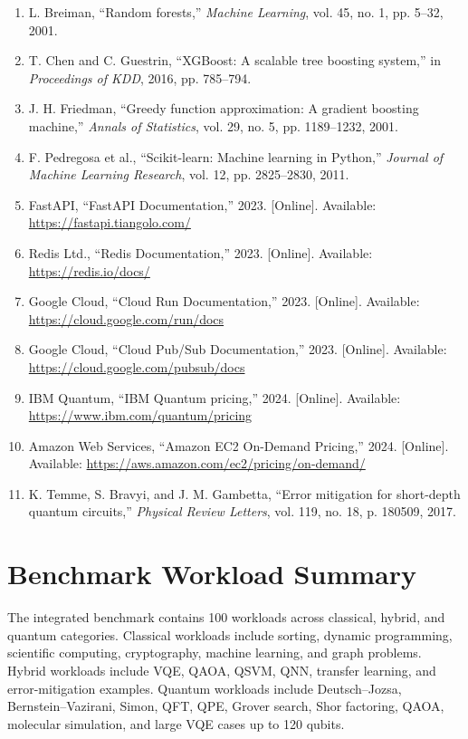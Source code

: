 \documentclass[12pt,a4paper]{report}
\begin{document}
\begin{enumerate}
\item L. Breiman, ``Random forests,'' \textit{Machine Learning}, vol. 45, no. 1, pp. 5--32, 2001.
\item T. Chen and C. Guestrin, ``XGBoost: A scalable tree boosting system,'' in \textit{Proceedings of KDD}, 2016, pp. 785--794.
\item J. H. Friedman, ``Greedy function approximation: A gradient boosting machine,'' \textit{Annals of Statistics}, vol. 29, no. 5, pp. 1189--1232, 2001.
\item F. Pedregosa et al., ``Scikit-learn: Machine learning in Python,'' \textit{Journal of Machine Learning Research}, vol. 12, pp. 2825--2830, 2011.
\item FastAPI, ``FastAPI Documentation,'' 2023. [Online]. Available: \url{https://fastapi.tiangolo.com/}
\item Redis Ltd., ``Redis Documentation,'' 2023. [Online]. Available: \url{https://redis.io/docs/}
\item Google Cloud, ``Cloud Run Documentation,'' 2023. [Online]. Available: \url{https://cloud.google.com/run/docs}
\item Google Cloud, ``Cloud Pub/Sub Documentation,'' 2023. [Online]. Available: \url{https://cloud.google.com/pubsub/docs}
\item IBM Quantum, ``IBM Quantum pricing,'' 2024. [Online]. Available: \url{https://www.ibm.com/quantum/pricing}
\item Amazon Web Services, ``Amazon EC2 On-Demand Pricing,'' 2024. [Online]. Available: \url{https://aws.amazon.com/ec2/pricing/on-demand/}
\item K. Temme, S. Bravyi, and J. M. Gambetta, ``Error mitigation for short-depth quantum circuits,'' \textit{Physical Review Letters}, vol. 119, no. 18, p. 180509, 2017.
\end{enumerate}

\appendix
\chapter{Benchmark Workload Summary}
The integrated benchmark contains 100 workloads across classical, hybrid, and quantum categories. Classical workloads include sorting, dynamic programming, scientific computing, cryptography, machine learning, and graph problems. Hybrid workloads include VQE, QAOA, QSVM, QNN, transfer learning, and error-mitigation examples. Quantum workloads include Deutsch--Jozsa, Bernstein--Vazirani, Simon, QFT, QPE, Grover search, Shor factoring, QAOA, molecular simulation, and large VQE cases up to 120 qubits.
\end{document}
